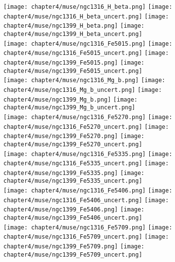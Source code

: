 \begin{figure*}
	\centering
	\texttt{[image: chapter4/muse/ngc1316\_H\_beta.png]}
	\texttt{[image: chapter4/muse/ngc1316\_H\_beta\_uncert.png]}
	\texttt{[image: chapter4/muse/ngc1399\_H\_beta.png]}
	\texttt{[image: chapter4/muse/ngc1399\_H\_beta\_uncert.png]}
	\\
	\texttt{[image: chapter4/muse/ngc1316\_Fe5015.png]}
	\texttt{[image: chapter4/muse/ngc1316\_Fe5015\_uncert.png]}
	\texttt{[image: chapter4/muse/ngc1399\_Fe5015.png]}
	\texttt{[image: chapter4/muse/ngc1399\_Fe5015\_uncert.png]}
	\\
	\texttt{[image: chapter4/muse/ngc1316\_Mg\_b.png]}
	\texttt{[image: chapter4/muse/ngc1316\_Mg\_b\_uncert.png]}
	\texttt{[image: chapter4/muse/ngc1399\_Mg\_b.png]}
	\texttt{[image: chapter4/muse/ngc1399\_Mg\_b\_uncert.png]}
	\\
	\texttt{[image: chapter4/muse/ngc1316\_Fe5270.png]}
	\texttt{[image: chapter4/muse/ngc1316\_Fe5270\_uncert.png]}
	\texttt{[image: chapter4/muse/ngc1399\_Fe5270.png]}
	\texttt{[image: chapter4/muse/ngc1399\_Fe5270\_uncert.png]}
	\\
	\texttt{[image: chapter4/muse/ngc1316\_Fe5335.png]}
	\texttt{[image: chapter4/muse/ngc1316\_Fe5335\_uncert.png]}
	\texttt{[image: chapter4/muse/ngc1399\_Fe5335.png]}
	\texttt{[image: chapter4/muse/ngc1399\_Fe5335\_uncert.png]}
	\\
	\texttt{[image: chapter4/muse/ngc1316\_Fe5406.png]}
	\texttt{[image: chapter4/muse/ngc1316\_Fe5406\_uncert.png]}
	\texttt{[image: chapter4/muse/ngc1399\_Fe5406.png]}
	\texttt{[image: chapter4/muse/ngc1399\_Fe5406\_uncert.png]}
	\\
	\texttt{[image: chapter4/muse/ngc1316\_Fe5709.png]}
	\texttt{[image: chapter4/muse/ngc1316\_Fe5709\_uncert.png]}
	\texttt{[image: chapter4/muse/ngc1399\_Fe5709.png]}
	\texttt{[image: chapter4/muse/ngc1399\_Fe5709\_uncert.png]}
	\\
\end{figure*}


